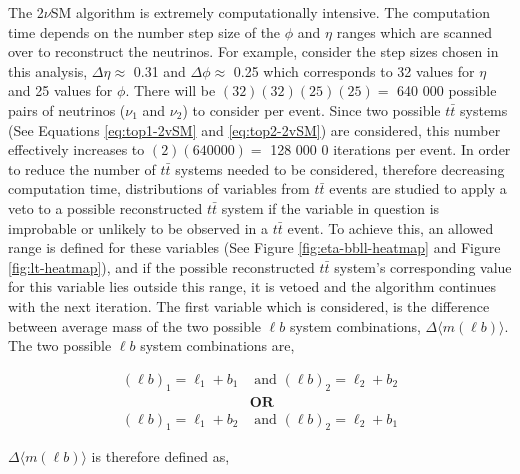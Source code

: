 The 2$\nu$SM algorithm is extremely computationally intensive. The computation time depends on the number step size of the $\phi$ and $\eta$ ranges which are scanned over to reconstruct the neutrinos. For example, consider the step sizes chosen in this analysis, $\Delta \eta \approx$ 0.31 and $\Delta \phi \approx$ 0.25 which corresponds to 32 values for $\eta$ and 25 values for $\phi$. There will be $(32)(32)(25)(25) = $ 640 000 possible pairs of neutrinos ($\nu_{1}$ and $\nu_{2}$) to consider per event. Since two possible $t\bar{t}$ systems (See Equations \ref{eq:top1-2vSM} and \ref{eq:top2-2vSM}) are considered, this number effectively increases to $(2)(640000) = $ 128 000 0 iterations per event. In order to reduce the number of $t\bar{t}$ systems needed to be considered, therefore decreasing computation time, distributions of variables from $t\bar{t}$ events are studied to apply a veto to a possible reconstructed $t\bar{t}$ system if the variable in question is improbable or unlikely to be observed in a $t\bar{t}$ event. To achieve this, an allowed range is defined for these variables (See Figure \ref{fig:eta-bbll-heatmap} and Figure \ref{fig:lt-heatmap}), and if the possible reconstructed $t\bar{t}$ system's corresponding value for this variable lies outside this range, it is vetoed and the algorithm continues with the next iteration. The first variable which is considered, is the difference between average mass of the two possible $\ell b$ system combinations, $\Delta \langle m(\ell b)\rangle$. The two possible $\ell b$ system combinations are,

\begin{align}
    (\ell b)_{1} = \ell_{1} + b_{1} &\text{ and }  (\ell b)_{2}  = \ell_{2} + b_{2} \\
    &\textbf{OR}\nonumber\\ 
     (\ell b)_{1} = \ell_{1} + b_{2} &\text{ and }  (\ell b)_{2}  = \ell_{2} + b_{1} 
\end{align}

$\Delta \langle m(\ell b) \rangle$ is therefore defined as,


